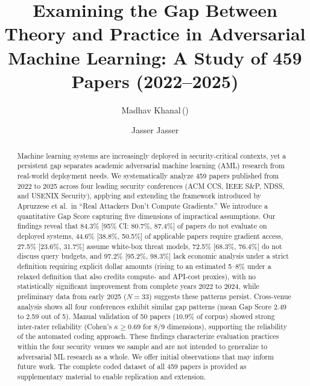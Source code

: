 \documentclass[runningheads]{llncs}
\begin{document}
\title{Examining the Gap Between Theory and Practice in Adversarial Machine Learning: A Study of 459 Papers (2022--2025)}

\author{Madhav Khanal\,(\Envelope) \and Jasser Jasser}

\maketitle

\begin{abstract}
Machine learning systems are increasingly deployed in security-critical contexts, yet a persistent gap separates academic adversarial machine learning (AML) research from real-world deployment needs. We systematically analyze 459 papers published from 2022 to 2025 across four leading security conferences (ACM CCS, IEEE S\&P, NDSS, and USENIX Security), applying and extending the framework introduced by Apruzzese et al.\ in ``Real Attackers Don't Compute Gradients.'' We introduce a quantitative Gap Score capturing five dimensions of impractical assumptions. Our findings reveal that 84.3\% [95\% CI: 80.7\%, 87.4\%] of papers do not evaluate on deployed systems, 44.6\% [38.8\%, 50.5\%] of applicable papers require gradient access, 27.5\% [23.6\%, 31.7\%] assume white-box threat models, 72.5\% [68.3\%, 76.4\%] do not discuss query budgets, and 97.2\% [95.2\%, 98.3\%] lack economic analysis under a strict definition requiring explicit dollar amounts (rising to an estimated 5--8\% under a relaxed definition that also credits compute- and API-cost proxies), with no statistically significant improvement from complete years 2022 to 2024, while preliminary data from early 2025 ($N = 33$) suggests these patterns persist. Cross-venue analysis shows all four conferences exhibit similar gap patterns (mean Gap Score 2.49 to 2.59 out of 5). Manual validation of 50 papers (10.9\% of corpus) showed strong inter-rater reliability (Cohen's $\kappa \geq 0.69$ for 8/9 dimensions), supporting the reliability of the automated coding approach. These findings characterize evaluation practices within the four security venues we sample and are not intended to generalize to adversarial ML research as a whole. We offer initial observations that may inform future work. The complete coded dataset of all 459 papers is provided as supplementary material to enable replication and extension.

\end{abstract}
\end{document}
